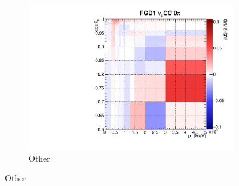 \begin{figure}
\begin{subfigure}[t]{0.32\textwidth}
		\includegraphics[width=\textwidth, trim={0mm 0mm 10mm 7mm}, clip, page=18]{figures/mach3/banff/postfit_comp}
		\caption{Other}
	\end{subfigure}
	

\end{figure}

